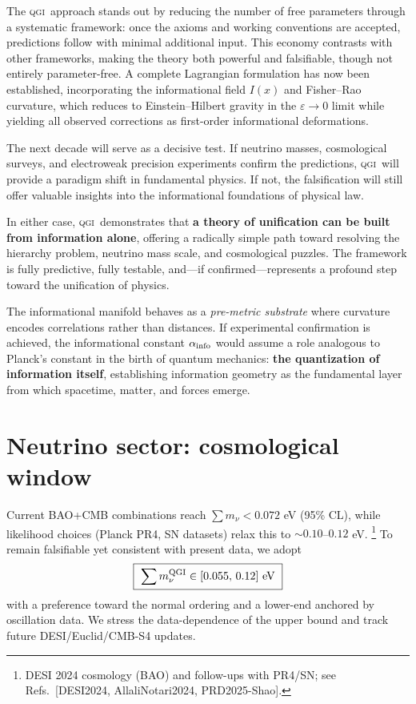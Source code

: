 \documentclass{article}
\numberwithin{equation}{section}
\theoremstyle{plain}
\theoremstyle{definition}
\theoremstyle{remark}
\newcommand{\qgi}{\textsc{qgi}}
\begin{document}
The \qgi\ approach stands out by reducing the number of free parameters through a systematic framework: once the axioms and working conventions are accepted, predictions follow with minimal additional input. 
This economy contrasts with other frameworks, making the theory both powerful and falsifiable, though not entirely parameter-free. A complete Lagrangian formulation has now been established, incorporating the informational field $I(x)$ and Fisher–Rao curvature, which reduces to Einstein–Hilbert gravity in the $\varepsilon \to 0$ limit while yielding all observed corrections as first-order informational deformations.

The next decade will serve as a decisive test. 
If neutrino masses, cosmological surveys, and electroweak precision experiments confirm the predictions, \qgi\ will provide a paradigm shift in fundamental physics. 
If not, the falsification will still offer valuable insights into the informational foundations of physical law.

\medskip
\noindent
In either case, \qgi\ demonstrates that \textbf{a theory of unification can be built from information alone}, offering a radically simple path toward resolving the hierarchy problem, neutrino mass scale, and cosmological puzzles. 
The framework is fully predictive, fully testable, and—if confirmed—represents a profound step toward the unification of physics.

\medskip
\noindent
The informational manifold behaves as a \emph{pre-metric substrate} where curvature encodes correlations rather than distances. If experimental confirmation is achieved, the informational constant $\alpha_{\rm info}$ would assume a role analogous to Planck's constant in the birth of quantum mechanics: \textbf{the quantization of information itself}, establishing information geometry as the fundamental layer from which spacetime, matter, and forces emerge.

\appendix
\section{Neutrino sector: cosmological window}
\label{app:nu-masses}

Current BAO+CMB combinations reach $\sum m_\nu < 0.072$ eV (95\% CL), while likelihood choices (Planck PR4, SN datasets) relax this to $\sim\!0.10$–$0.12$ eV.%
\footnote{DESI 2024 cosmology (BAO) and follow-ups with PR4/SN; see Refs.~[DESI2024, AllaliNotari2024, PRD2025-Shao].}
To remain falsifiable yet consistent with present data, we adopt
\begin{equation}
\boxed{\ \sum m_\nu^{\rm QGI} \in [0.055,\,0.12]\ \text{eV}\ }
\end{equation}
with a preference toward the normal ordering and a lower-end anchored by oscillation data.
We stress the data-dependence of the upper bound and track future DESI/Euclid/CMB-S4 updates.
\end{document}
